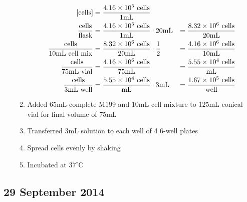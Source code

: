 \begin{enumerate}
\begin{enumerate}
				\begin{align*}
				\text{[cells]} &= \frac{4.16\times 10^{5}\text{ cells}}{1\text{mL}} \\
				\frac{\text{cells}}{\text{flask}} &= \frac{4.16\times 10^{5}\text{ cells}}{1\text{mL}} \cdot 20\text{mL} &= \frac{8.32\times 10^{6}\text{ cells}}{20\text{mL}}\\
				\frac{\text{cells}}{10\text{mL cell mix}} &= \frac{8.32\times 10^{6}\text{ cells}}{20\text{mL}}\cdot \frac{1}{2} &= \frac{4.16\times 10^{6}\text{ cells}}{10\text{mL}}\\
				\frac{\text{cells}}{75\text{mL vial}} &= \frac{4.16\times 10^{6}\text{ cells}}{75\text{mL}} &= \frac{5.55\times 10^{4}\text{ cells}}{\text{mL}}\\
				\frac{\text{cells}}{3\text{mL well}} &= \frac{5.55\times 10^{4}\text{ cells}}{\text{mL}} \cdot 3\text{mL} &= \frac{1.67\times 10^{5}\text{ cells}}{\text{well}}\\
				\end{align*}
			\item Added $65$mL complete M199 and $10$mL cell mixture to $125$mL conical vial for final volume of $75$mL
			\item Transferred $3$mL solution to each well of 4 6-well plates
			\item Spread cells evenly by shaking
			\item Incubated at $37^{\circ}$C
		\end{enumerate}
\end{enumerate}

\subsection*{29 September 2014}

